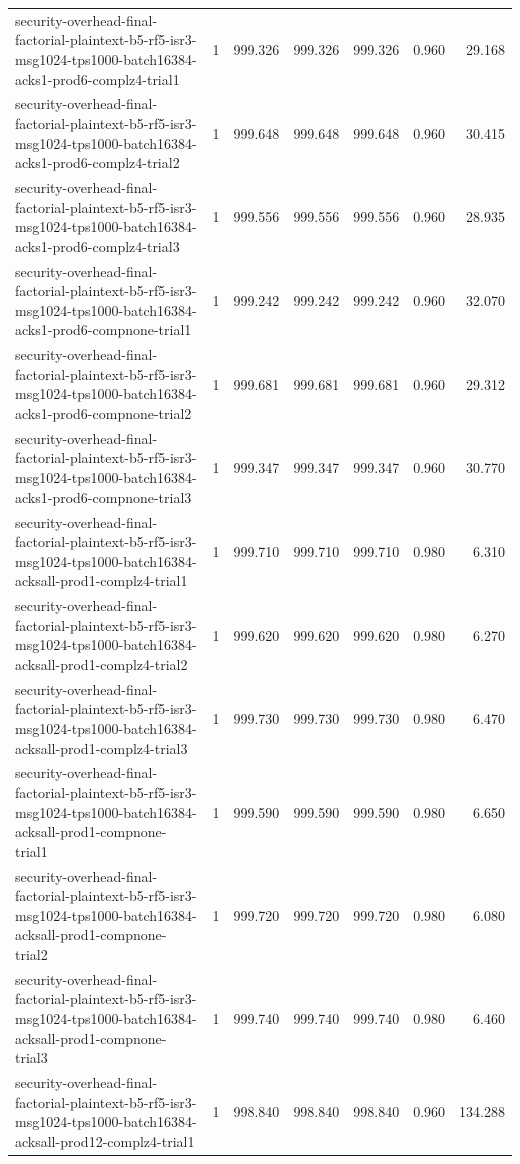 \begin{tabular}{lrrrrrr}
security-overhead-final-factorial-plaintext-b5-rf5-isr3-msg1024-tps1000-batch16384-acks1-prod6-complz4-trial1 & 1 & 999.326 & 999.326 & 999.326 & 0.960 & 29.168 \\
security-overhead-final-factorial-plaintext-b5-rf5-isr3-msg1024-tps1000-batch16384-acks1-prod6-complz4-trial2 & 1 & 999.648 & 999.648 & 999.648 & 0.960 & 30.415 \\
security-overhead-final-factorial-plaintext-b5-rf5-isr3-msg1024-tps1000-batch16384-acks1-prod6-complz4-trial3 & 1 & 999.556 & 999.556 & 999.556 & 0.960 & 28.935 \\
security-overhead-final-factorial-plaintext-b5-rf5-isr3-msg1024-tps1000-batch16384-acks1-prod6-compnone-trial1 & 1 & 999.242 & 999.242 & 999.242 & 0.960 & 32.070 \\
security-overhead-final-factorial-plaintext-b5-rf5-isr3-msg1024-tps1000-batch16384-acks1-prod6-compnone-trial2 & 1 & 999.681 & 999.681 & 999.681 & 0.960 & 29.312 \\
security-overhead-final-factorial-plaintext-b5-rf5-isr3-msg1024-tps1000-batch16384-acks1-prod6-compnone-trial3 & 1 & 999.347 & 999.347 & 999.347 & 0.960 & 30.770 \\
security-overhead-final-factorial-plaintext-b5-rf5-isr3-msg1024-tps1000-batch16384-acksall-prod1-complz4-trial1 & 1 & 999.710 & 999.710 & 999.710 & 0.980 & 6.310 \\
security-overhead-final-factorial-plaintext-b5-rf5-isr3-msg1024-tps1000-batch16384-acksall-prod1-complz4-trial2 & 1 & 999.620 & 999.620 & 999.620 & 0.980 & 6.270 \\
security-overhead-final-factorial-plaintext-b5-rf5-isr3-msg1024-tps1000-batch16384-acksall-prod1-complz4-trial3 & 1 & 999.730 & 999.730 & 999.730 & 0.980 & 6.470 \\
security-overhead-final-factorial-plaintext-b5-rf5-isr3-msg1024-tps1000-batch16384-acksall-prod1-compnone-trial1 & 1 & 999.590 & 999.590 & 999.590 & 0.980 & 6.650 \\
security-overhead-final-factorial-plaintext-b5-rf5-isr3-msg1024-tps1000-batch16384-acksall-prod1-compnone-trial2 & 1 & 999.720 & 999.720 & 999.720 & 0.980 & 6.080 \\
security-overhead-final-factorial-plaintext-b5-rf5-isr3-msg1024-tps1000-batch16384-acksall-prod1-compnone-trial3 & 1 & 999.740 & 999.740 & 999.740 & 0.980 & 6.460 \\
security-overhead-final-factorial-plaintext-b5-rf5-isr3-msg1024-tps1000-batch16384-acksall-prod12-complz4-trial1 & 1 & 998.840 & 998.840 & 998.840 & 0.960 & 134.288 \\

\end{tabular}
